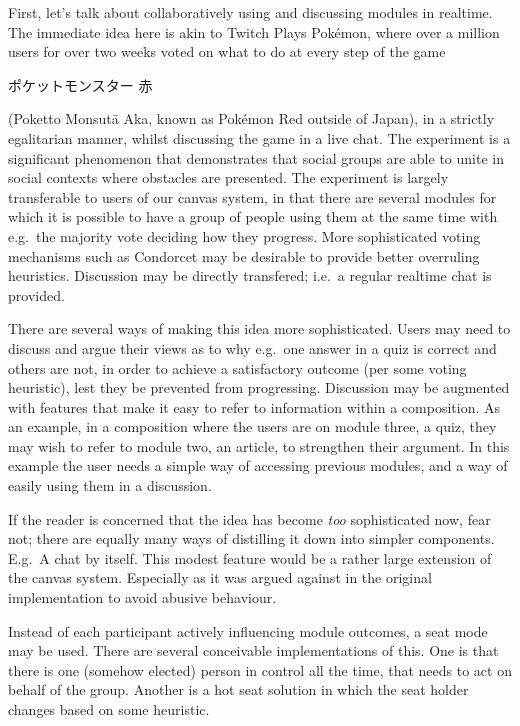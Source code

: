 First, let's talk about collaboratively using and discussing modules in 
realtime. The immediate idea here is akin to Twitch Plays Pokémon, where over 
a million users for over two weeks voted on what to do at every step of the 
game \begin{CJK}{UTF8}{min}ポケットモンスター 赤\end{CJK} (Poketto Monsut\={a} 
Aka, known as Pokémon Red outside of Japan), in a strictly egalitarian manner, 
whilst discussing the game in a live chat\cite{tpp}. The experiment is a 
significant phenomenon that demonstrates that social groups are able to unite 
in social contexts where obstacles are presented\cite{margeltwitch}. The 
experiment is largely transferable to users of our canvas system, in that 
there are several modules for which it is possible to have a group of people 
using them at the same time with e.g.\ the majority vote deciding how they 
progress. More sophisticated voting mechanisms such as Condorcet may be 
desirable to provide better overruling heuristics. Discussion may be directly 
transfered; i.e.\ a regular realtime chat is provided.

There are several ways of making this idea more sophisticated. Users may need 
to discuss and argue their views as to why e.g.\ one answer in a quiz is 
correct and others are not, in order to achieve a satisfactory outcome (per 
some voting heuristic), lest they be prevented from progressing. Discussion 
may be augmented with features that make it easy to refer to information 
within a composition. As an example, in a composition where the users are on 
module three, a quiz, they may wish to refer to module two, an article, to 
strengthen their argument. In this example the user needs a simple way of 
accessing previous modules, and a way of easily using them in a discussion.

If the reader is concerned that the idea has become \emph{too} sophisticated 
now, fear not; there are equally many ways of distilling it down into simpler 
components. E.g.\ A chat by itself. This modest feature would be a rather 
large extension of the canvas system. Especially as it was argued against in 
the original implementation to avoid abusive 
behaviour\cite{berntsen2015enabling}.

Instead of each participant actively influencing module outcomes, a seat mode 
may be used. There are several conceivable implementations of this. One is 
that there is one (somehow elected) person in control all the time, that needs 
to act on behalf of the group. Another is a hot seat solution in which the 
seat holder changes based on some heuristic.

